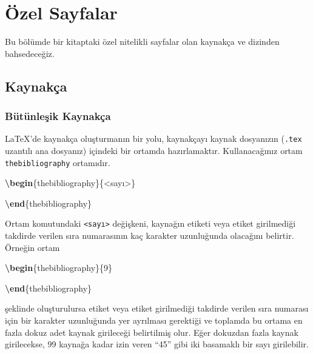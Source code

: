 \documentclass[
  10pt,
]{scrbook}
\newenvironment{Shaded}{\begin{snugshade}}{\end{snugshade}}
\newcommand{\ExtensionTok}[1]{#1}
\newcommand{\KeywordTok}[1]{\textcolor[rgb]{0.13,0.29,0.53}{\textbf{#1}}}
\newcommand{\NormalTok}[1]{#1}
\theoremstyle{definition}
\theoremstyle{definition}
\theoremstyle{definition}
\theoremstyle{definition}
\theoremstyle{remark}
\begin{document}
\hypertarget{uxf6zel-sayfalar}{%
\chapter{Özel Sayfalar}\label{uxf6zel-sayfalar}}

Bu bölümde bir kitaptaki özel nitelikli sayfalar olan kaynakça ve dizinden bahsedeceğiz.

\hypertarget{kaynakuxe7a}{%
\section{Kaynakça}\label{kaynakuxe7a}}

\hypertarget{buxfctuxfcnleux15fik-kaynakuxe7a}{%
\subsection{Bütünleşik Kaynakça}\label{buxfctuxfcnleux15fik-kaynakuxe7a}}

LaTeX'de kaynakça oluşturmanın bir yolu, kaynakçayı kaynak dosyanızın (\texttt{.tex} uzantılı ana dosyanız) içindeki bir ortamda hazırlamaktır. Kullanacağınız ortam \texttt{thebibliography} ortamıdır.

\begin{Shaded}
\begin{Highlighting}[]
\KeywordTok{\textbackslash{}begin}\NormalTok{\{}\ExtensionTok{thebibliography}\NormalTok{\}\{\textless{}sayı\textgreater{}\}}

\KeywordTok{\textbackslash{}end}\NormalTok{\{}\ExtensionTok{thebibliography}\NormalTok{\}}
\end{Highlighting}
\end{Shaded}

Ortam komutundaki \texttt{\textless{}sayı\textgreater{}} değişkeni, kaynağın etiketi veya etiket girilmediği takdirde verilen sıra numarasının kaç karakter uzunluğunda olacağını belirtir. Örneğin ortam

\begin{Shaded}
\begin{Highlighting}[]
\KeywordTok{\textbackslash{}begin}\NormalTok{\{}\ExtensionTok{thebibliography}\NormalTok{\}\{9\}}
        
\KeywordTok{\textbackslash{}end}\NormalTok{\{}\ExtensionTok{thebibliography}\NormalTok{\}}
\end{Highlighting}
\end{Shaded}

şeklinde oluşturulursa etiket veya etiket girilmediği takdirde verilen sıra numarası için bir karakter uzunluğunda yer ayrılması gerektiği ve toplamda bu ortama en fazla dokuz adet kaynak girileceği belirtilmiş olur. Eğer dokuzdan fazla kaynak girilecekse, 99 kaynağa kadar izin veren ``45'' gibi iki basamaklı bir sayı girilebilir.
\end{document}
